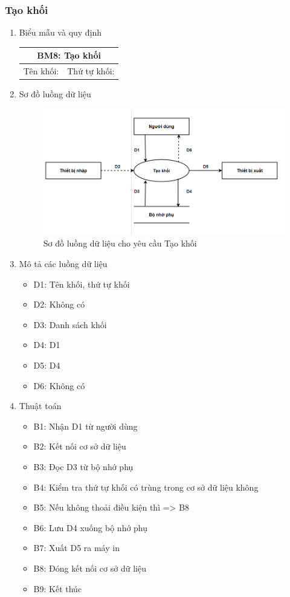 \documentclass[a4paper]{article}
\begin{document}
			\subsubsection{Tạo khối}	
			\begin{enumerate}
\item Biểu mẫu và quy định
\begin{table}[H]
\centering
\renewcommand{\arraystretch}{1.5}
\setlength{\tabcolsep}{12pt}
\begin{tabular}{|p{5cm}|p{5cm}|}
\hline
\multicolumn{2}{|c|}{\textbf{BM8: Tạo khối}} \\
\hline
Tên khối: \dotfill & Thứ tự khối: \dotfill \\
\hline
\end{tabular}
\end{table}
\item Sơ đồ luồng dữ liệu

\begin{figure}[H] 
    \centering
    \includegraphics[width=1\textwidth]{dfd8} %
    \caption{Sơ đồ luồng dữ liệu cho yêu cầu Tạo khối}
\end{figure}

\item Mô tả các luồng dữ liệu
\begin{itemize}
\item D1: Tên khối, thứ tự khối
\item D2: Không có
\item D3: Danh sách khối
\item D4: D1
\item D5: D4
\item D6: Không có
\end{itemize}
\item Thuật toán
\begin{itemize}
\item B1: Nhận D1 từ người dùng
\item B2: Kết nối cơ sở dữ liệu
\item B3: Đọc D3 từ bộ nhớ phụ
\item B4: Kiểm tra thứ tự khối có trùng trong cơ sở dữ liệu không
\item B5: Nếu không thoải điều kiện thì => B8
\item B6: Lưu D4 xuống bộ nhớ phụ
\item B7: Xuất D5 ra máy in
\item B8: Đóng kết nối cơ sở dữ liệu
\item B9: Kết thúc
\end{itemize}
\end{enumerate}	
			
\end{document}
